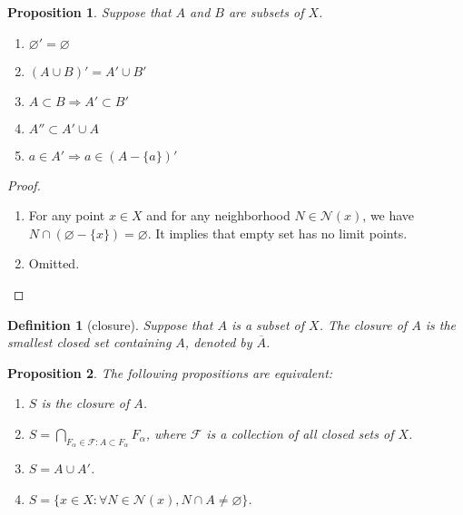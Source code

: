 \documentclass{report}
\newtheorem{definition}{Definition}[section]
\newtheorem{proposition}{Proposition}[section]
\theoremstyle{nonumberplain}
\newtheorem{proof}{Proof.}
\begin{document}
\begin{proposition}
	Suppose that $A$ and $B$ are subsets of $X$.
	\begin{enumerate}	
	\item $\varnothing'=\varnothing$ 
	\item $(A \cup B)'=A'\cup B' $
	\item $A \subset B \Longrightarrow A' \subset B'$
	\item $A'' \subset A' \cup A $
	\item $a \in A' \Longrightarrow a \in(A-\{a\})' $
	\end{enumerate}
\end{proposition}
\begin{proof}~\\ \vspace{-1em}
	\begin{enumerate}	
		\item For any point $x\in X$ and for any neighborhood $N\in\mathcal{N}(x)$, we have $N\cap(\varnothing-\{x\})=\varnothing$. It implies that empty set has no limit points.
		\item Omitted.
	\end{enumerate}
\end{proof}

\begin{definition}[closure]
Suppose that $A$ is a subset of $X$. The \emph{closure} of $A$ is the smallest closed set containing $A$, denoted by $\overline{A}$.
\end{definition}

\begin{proposition}
	The following propositions are equivalent:
	\begin{enumerate}	
		\item $S$ is the closure of $A$.
		\item $S=\bigcap\limits_{F_\alpha\in\mathcal{F}:A\subset F_\alpha}F_\alpha$, where $\mathcal{F}$ is a collection of all closed sets of $X$.
		\item $S=A\cup A'$.
		\item $S=\{x\in X: \forall N\in\mathcal{N}(x),N\cap A\ne\varnothing\}$.
	\end{enumerate}
\end{proposition}
\end{document}
